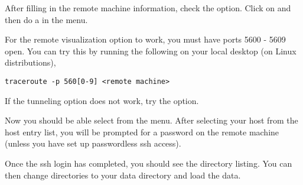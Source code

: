 \documentclass[11pt,fleqn]{book} %
\begin{document}
After filling in the remote machine information, 
check the  option. 
Click on  and then do a  in the  menu.

For the remote visualization option to work, you must have ports 5600
- 5609 open. You can try this by running the following on your local
desktop (on Linux distributions),
\begin{lstlisting}
traceroute -p 560[0-9] <remote machine>
\end{lstlisting}

If the tunneling option does not work, try the  option.

Now you should be able select  from the \Visit {} menu. After
selecting your host from the host entry list, you will be prompted for
a password on the remote machine (unless you have set up passwordless
ssh access).

Once the ssh login has completed, you should see the directory
listing. You can then change directories to your data directory and load the
data.

%
\end{document}
